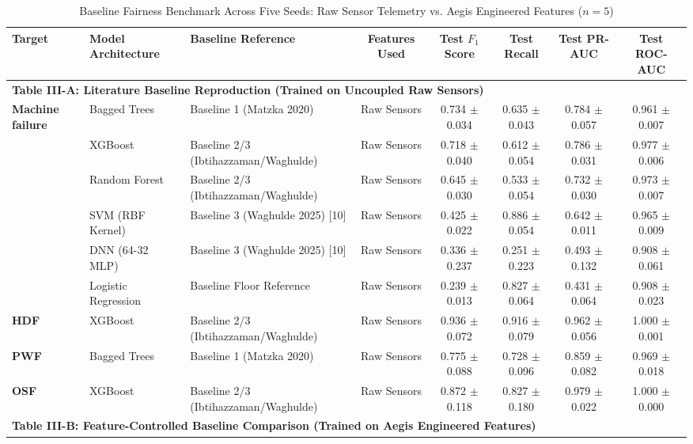 \documentclass[conference]{IEEEtran}
\begin{document}
\begin{itemize}
\begin{table}[t]
\caption{Baseline Fairness Benchmark Across Five Seeds: Raw Sensor Telemetry vs. Aegis Engineered Features ($n=5$)}
\centering
\begin{tabular}{lllccccc}
\toprule
\textbf{Target} & \textbf{Model Architecture} & \textbf{Baseline Reference} & \textbf{Features Used} & \textbf{Test $F_1$ Score} & \textbf{Test Recall} & \textbf{Test PR-AUC} & \textbf{Test ROC-AUC} \\
\midrule
\multicolumn{8}{l}{\textbf{Table III-A: Literature Baseline Reproduction (Trained on Uncoupled Raw Sensors)}} \\
\midrule
\multirow{6}{*}{\textbf{Machine failure}} & Bagged Trees & Baseline 1 (Matzka 2020) \cite{b5} & Raw Sensors & 0.734 $\pm$ 0.034 & 0.635 $\pm$ 0.043 & 0.784 $\pm$ 0.057 & 0.961 $\pm$ 0.007 \\
 & XGBoost & Baseline 2/3 (Ibtihazzaman/Waghulde) \cite{b6, b10} & Raw Sensors & 0.718 $\pm$ 0.040 & 0.612 $\pm$ 0.054 & 0.786 $\pm$ 0.031 & 0.977 $\pm$ 0.006 \\
 & Random Forest & Baseline 2/3 (Ibtihazzaman/Waghulde) \cite{b6, b10} & Raw Sensors & 0.645 $\pm$ 0.030 & 0.533 $\pm$ 0.054 & 0.732 $\pm$ 0.030 & 0.973 $\pm$ 0.007 \\
 & SVM (RBF Kernel) & Baseline 3 (Waghulde 2025) [10] & Raw Sensors & 0.425 $\pm$ 0.022 & 0.886 $\pm$ 0.054 & 0.642 $\pm$ 0.011 & 0.965 $\pm$ 0.009 \\
 & DNN (64-32 MLP) & Baseline 3 (Waghulde 2025) [10] & Raw Sensors & 0.336 $\pm$ 0.237 & 0.251 $\pm$ 0.223 & 0.493 $\pm$ 0.132 & 0.908 $\pm$ 0.061 \\
 & Logistic Regression & Baseline Floor Reference & Raw Sensors & 0.239 $\pm$ 0.013 & 0.827 $\pm$ 0.064 & 0.431 $\pm$ 0.064 & 0.908 $\pm$ 0.023 \\
\midrule
\textbf{HDF} & XGBoost & Baseline 2/3 (Ibtihazzaman/Waghulde) & Raw Sensors & 0.936 $\pm$ 0.072 & 0.916 $\pm$ 0.079 & 0.962 $\pm$ 0.056 & 1.000 $\pm$ 0.001 \\
\textbf{PWF} & Bagged Trees & Baseline 1 (Matzka 2020) & Raw Sensors & 0.775 $\pm$ 0.088 & 0.728 $\pm$ 0.096 & 0.859 $\pm$ 0.082 & 0.969 $\pm$ 0.018 \\
\textbf{OSF} & XGBoost & Baseline 2/3 (Ibtihazzaman/Waghulde) & Raw Sensors & 0.872 $\pm$ 0.118 & 0.827 $\pm$ 0.180 & 0.979 $\pm$ 0.022 & 1.000 $\pm$ 0.000 \\
\midrule
\multicolumn{8}{l}{\textbf{Table III-B: Feature-Controlled Baseline Comparison (Trained on Aegis Engineered Features)}} \\

\end{tabular}
\end{table}
\end{itemize}
\end{document}
